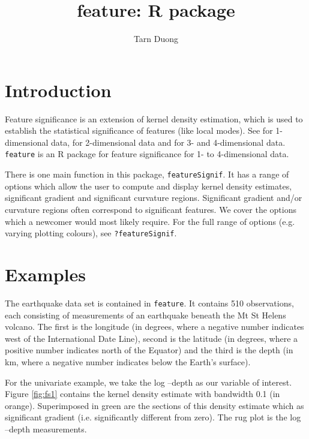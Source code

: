 \documentclass[a4paper]{article}
\title{feature: R package}
\author{Tarn Duong}
\begin{document}
\maketitle

\section{Introduction}

Feature significance is an extension of kernel density estimation, 
which is used to establish the statistical significance of 
features (like local modes). See  for 1-dimensional data,
 for  2-dimensional data and 
for 3- and 4-dimensional data. \texttt{feature} is an R package for 
feature significance for 1- to 4-dimensional data.
  
There is one main function in this package, \texttt{featureSignif}. 
It has a range of options which allow
the user to compute and display kernel density estimates, significant gradient
and significant curvature regions. Significant gradient and/or
curvature regions often correspond to significant features. 
We cover the options which a newcomer would most likely require. 
For the full range of options (e.g. varying
plotting colours), see \texttt{?featureSignif}.


\section{Examples}
The earthquake data set is contained in 
\texttt{feature}. It contains 510 observations, each consisting
of measurements of an earthquake beneath the Mt St Helens volcano.
The first is the longitude (in degrees, where a negative number
indicates west of the International Date Line), second  is
the latitude (in degrees, where a positive number indicates north of
the Equator) and the third  is the depth (in km, where a
negative number indicates below the Earth's surface).

For the univariate example, we take the log --depth
as our variable of interest. 
Figure \ref{fig:fs1} contains the kernel
density estimate with bandwidth 0.1 (in orange). Superimposed in green 
are the sections of this density estimate which as significant gradient
(i.e. significantly different from zero). The rug plot is 
the log --depth measurements.
\end{document}
